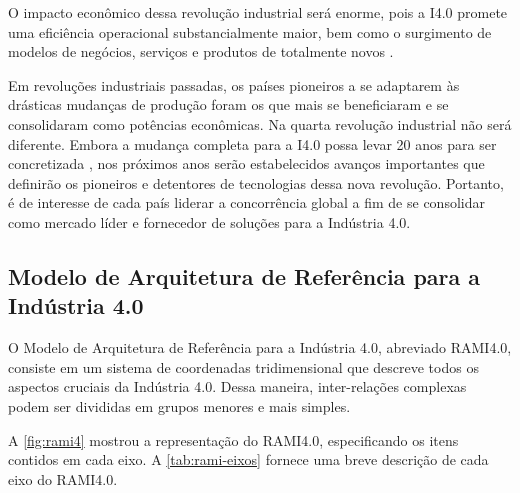 O impacto econômico dessa revolução industrial será enorme, pois a I4.0 promete uma eficiência operacional substancialmente maior, bem como o surgimento de modelos de negócios, serviços e produtos de totalmente novos \cite{hermann2016design}.

Em revoluções industriais passadas, os países pioneiros a se adaptarem às drásticas mudanças de produção foram os que mais se beneficiaram e se consolidaram como potências econômicas. Na quarta revolução industrial não será diferente. Embora a mudança completa para a I4.0 possa levar 20 anos para ser concretizada \cite{russmann2015industryfour}, nos próximos anos serão estabelecidos avanços importantes que definirão os pioneiros e detentores de tecnologias dessa nova revolução. Portanto, é de interesse de cada país liderar a concorrência global a fim de se consolidar como mercado líder e fornecedor de soluções para a Indústria 4.0.

\subsection{Modelo de Arquitetura de Referência para a Indústria 4.0}
\label{sub:rami4}

O Modelo de Arquitetura de Referência para a Indústria 4.0, abreviado RAMI4.0, consiste em um sistema de coordenadas tridimensional que descreve todos os aspectos cruciais da Indústria 4.0. Dessa maneira, inter-relações complexas podem ser divididas em grupos menores e mais simples.

A \autoref{fig:rami4} mostrou a representação do RAMI4.0, especificando os itens contidos em cada eixo. A \autoref{tab:rami-eixos} fornece uma breve descrição de cada eixo do RAMI4.0.

